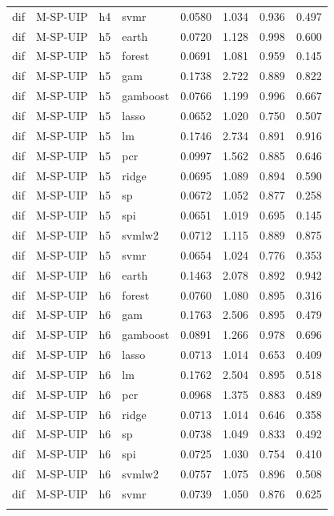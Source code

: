 \begin{ThreePartTable}
\begin{longtable}[t]{llclcccc}
dif & M-SP-UIP & h4 & svmr & 0.0580 & 1.034 & 0.936 & 0.497\\
\addlinespace
dif & M-SP-UIP & h5 & earth & 0.0720 & 1.128 & 0.998 & 0.600\\
dif & M-SP-UIP & h5 & forest & 0.0691 & 1.081 & 0.959 & 0.145\\
dif & M-SP-UIP & h5 & gam & 0.1738 & 2.722 & 0.889 & 0.822\\
dif & M-SP-UIP & h5 & gamboost & 0.0766 & 1.199 & 0.996 & 0.667\\
dif & M-SP-UIP & h5 & lasso & 0.0652 & 1.020 & 0.750 & 0.507\\
dif & M-SP-UIP & h5 & lm & 0.1746 & 2.734 & 0.891 & 0.916\\
dif & M-SP-UIP & h5 & pcr & 0.0997 & 1.562 & 0.885 & 0.646\\
dif & M-SP-UIP & h5 & ridge & 0.0695 & 1.089 & 0.894 & 0.590\\
dif & M-SP-UIP & h5 & sp & 0.0672 & 1.052 & 0.877 & 0.258\\
dif & M-SP-UIP & h5 & spi & 0.0651 & 1.019 & 0.695 & 0.145\\
dif & M-SP-UIP & h5 & svmlw2 & 0.0712 & 1.115 & 0.889 & 0.875\\
dif & M-SP-UIP & h5 & svmr & 0.0654 & 1.024 & 0.776 & 0.353\\
\addlinespace
dif & M-SP-UIP & h6 & earth & 0.1463 & 2.078 & 0.892 & 0.942\\
dif & M-SP-UIP & h6 & forest & 0.0760 & 1.080 & 0.895 & 0.316\\
dif & M-SP-UIP & h6 & gam & 0.1763 & 2.506 & 0.895 & 0.479\\
dif & M-SP-UIP & h6 & gamboost & 0.0891 & 1.266 & 0.978 & 0.696\\
dif & M-SP-UIP & h6 & lasso & 0.0713 & 1.014 & 0.653 & 0.409\\
dif & M-SP-UIP & h6 & lm & 0.1762 & 2.504 & 0.895 & 0.518\\
dif & M-SP-UIP & h6 & pcr & 0.0968 & 1.375 & 0.883 & 0.489\\
dif & M-SP-UIP & h6 & ridge & 0.0713 & 1.014 & 0.646 & 0.358\\
dif & M-SP-UIP & h6 & sp & 0.0738 & 1.049 & 0.833 & 0.492\\
dif & M-SP-UIP & h6 & spi & 0.0725 & 1.030 & 0.754 & 0.410\\
dif & M-SP-UIP & h6 & svmlw2 & 0.0757 & 1.075 & 0.896 & 0.508\\
dif & M-SP-UIP & h6 & svmr & 0.0739 & 1.050 & 0.876 & 0.625\\
\addlinespace

\end{longtable}
\end{ThreePartTable}
